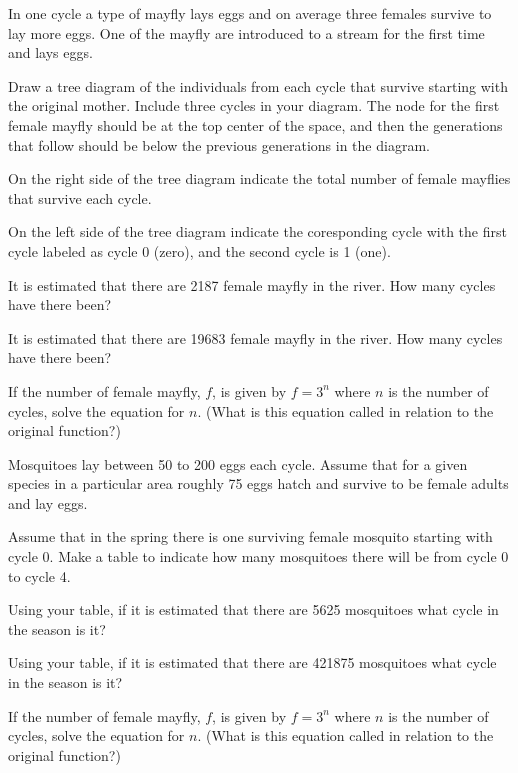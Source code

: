 \begin{problem}
\clearpage

\item In one cycle a type of mayfly lays eggs and on average three
  females survive to lay more eggs. One of the mayfly are introduced
  to a stream for the first time and lays eggs.
  \begin{subproblem}
  \item Draw a tree diagram of the individuals from each cycle that
    survive starting with the original mother. Include three cycles in
    your diagram. The node for the first female mayfly should be at
    the top center of the space, and then the generations that follow
    should be below the previous generations in the diagram.  

    \vfill

  \item On the right side of the tree diagram indicate the total number
    of female mayflies that survive each cycle.
  \item On the left side of the tree diagram indicate the coresponding cycle with the
    first cycle labeled as cycle 0 (zero), and the second cycle is 1 (one).
  \item It is estimated that there are 2187 female mayfly in the river. How
    many cycles have there been?
    \vspace{3em}
  \item It is estimated that there are 19683 female mayfly in the river. How
    many cycles have there been?
    \vspace{3em}
  \item If the number of female mayfly, $f$, is given by $f=3^n$ where
    $n$ is the number of cycles, solve the equation for $n$. (What is
    this equation called in relation to the original function?)
    \vspace{3em}
  \end{subproblem}

\clearpage

\item Mosquitoes lay between 50 to 200 eggs each cycle. Assume that
  for a given species in a particular area roughly 75 eggs hatch and
  survive to be female adults and lay eggs.
  \begin{subproblem}
  \item Assume that in the spring there is one surviving female
    mosquito starting with cycle 0. Make a table to indicate how many
    mosquitoes there will be from cycle 0 to cycle 4.
    \vfill
  \item Using your table, if it is estimated that there are 5625
    mosquitoes what cycle in the season is it?
    \vfill
  \item Using your table, if it is estimated that there are 421875
    mosquitoes what cycle in the season is it?
    \vfill
  \item If the number of female mayfly, $f$, is given by $f=3^n$ where
    $n$ is the number of cycles, solve the equation for $n$. (What is
    this equation called in relation to the original function?)
    \vspace{3em}
  \end{subproblem}


\end{problem}
